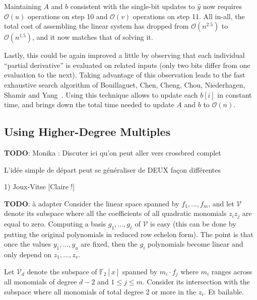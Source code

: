 \documentclass[a4paper,UKenglish,cleveref, autoref]{lipics-v2019}
\newcommand{\bigO}[1]{\ensuremath{\mathcal{O}\left( #1 \right)} }
\newcommand{\red}{\color{red}}
\newcommand{\TODO}[1]{{\red \textbf{TODO}:} #1\xspace}
\begin{document}
Maintaining $A$ and $b$ consistent with the single-bit updates to $\hat y$ now
requires $\bigO{u}$ operations on step 10 and $\bigO{v}$ operations on step
11. All in-all, the total cost of assembling the linear system has dropped from
$\bigO{n^{2.5}}$ to $\bigO{n^{1.5}}$, and it now matches that of solving it.

Lastly, this could be again improved a little by observing that each individual
``partial derivative'' is evaluated on related inputs (only two bits differ from
one evaluation to the next). Taking advantage of this observation leads to the
fast exhaustive search algorithm of Bouillaguet, Chen, Cheng, Chou, Niederhagen,
Shamir and Yang~\cite{BouillaguetCCCNSY10}. Using this technique allows to
update each $b[i]$ in constant time, and brings down the total time needed to
update $A$ and $b$ to $\bigO{n}$.

\subsection{Using Higher-Degree Multiples}

\TODO{Monika : Discuter ici qu'on peut aller vers crossbred complet}

L'idée simple de départ peut se généraliser de DEUX façon différentes

1) Joux-Vitse [Claire !]

\TODO{à adapter}
Consider the linear space spanned by $f_1, \dots, f_m$, and let $\mathcal{V}$
denote its subspace where all the coefficients of all quadratic monomials
$z_i z_j$ are equal to zero. Computing a basis $g_1, \dots, g_\ell$ of
$\mathcal{V}$ is easy (this can be done by putting the original polynomials in
reduced row echelon form). The point is that once the values $y_1, \dots, y_u$
are fixed, then the $g_i$ polynomials become linear and only depend on
$z_1, \dots, z_v$.


Let $\mathcal{V}_d$ denote the subspace of $\mathbb{F}_2[x]$ spanned by
$m_i \cdot f_j$ where $m_i$ ranges across all monomials of degree $d-2$ and
$1 \leq j \leq m$. Consider its intersection with the subspace where all
monomials of total degree 2 or more in the $z_i$. Et bailable.
\end{document}
